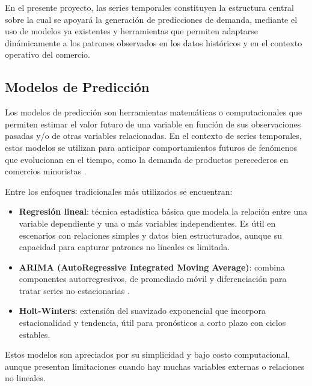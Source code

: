 En el presente proyecto, las series temporales constituyen la estructura central sobre la cual se apoyará la generación de predicciones de demanda, mediante el uso de modelos ya existentes y herramientas que permiten adaptarse dinámicamente a los patrones observados en los datos históricos y en el contexto operativo del comercio.

\subsection{Modelos de Predicción}

Los modelos de predicción son herramientas matemáticas o computacionales que permiten estimar el valor futuro de una variable en función de sus observaciones pasadas y/o de otras variables relacionadas. En el contexto de series temporales, estos modelos se utilizan para anticipar comportamientos futuros de fenómenos que evolucionan en el tiempo, como la demanda de productos perecederos en comercios minoristas \parencite{hyndman2018}.

Entre los enfoques tradicionales más utilizados se encuentran:

\begin{itemize}
    \item \textbf{Regresión lineal}: técnica estadística básica que modela la relación entre una variable dependiente y una o más variables independientes. Es útil en escenarios con relaciones simples y datos bien estructurados, aunque su capacidad para capturar patrones no lineales es limitada.
    
    \item \textbf{ARIMA (AutoRegressive Integrated Moving Average)}: combina componentes autorregresivos, de promediado móvil y diferenciación para tratar series no estacionarias \parencite{box2015}.
    
    \item \textbf{Holt-Winters}: extensión del suavizado exponencial que incorpora estacionalidad y tendencia, útil para pronósticos a corto plazo con ciclos estables.
\end{itemize}

Estos modelos son apreciados por su simplicidad y bajo costo computacional, aunque presentan limitaciones cuando hay muchas variables externas o relaciones no lineales.

